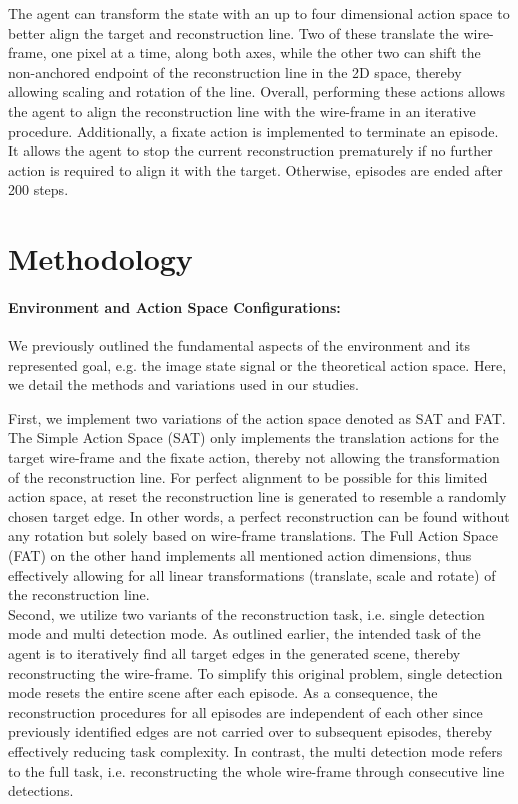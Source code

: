 \documentclass[11pt]{article} %
\begin{document}
The agent can transform the state with an up to four dimensional action space to better align the target and reconstruction line.
Two of these translate the wire-frame, one pixel at a time, along both axes, while the other two can shift the non-anchored endpoint of the reconstruction line in the 2D space, thereby allowing scaling and rotation of the line. Overall, performing these actions allows the agent to align the reconstruction line with the wire-frame in an iterative procedure. 
Additionally, a fixate action is implemented to terminate an episode. It allows the agent to stop the current reconstruction prematurely if no further action is required to align it with the target. Otherwise, episodes are ended after 200 steps.

\section{Methodology}
\paragraph{Environment and Action Space Configurations:}
We previously outlined the fundamental aspects of the environment and its represented goal, e.g. the image state signal or the theoretical action space. Here, we detail the methods and variations used in our studies.

First, we implement two variations of the action space denoted as SAT and FAT. 
The Simple Action Space (SAT) only implements the translation actions for the target wire-frame and the fixate action, thereby not allowing the transformation of the reconstruction line.
For perfect alignment to be possible for this limited action space, at reset the reconstruction line is generated to resemble a randomly chosen target edge. In other words, a perfect reconstruction can be found without any rotation but solely based on wire-frame translations.
The Full Action Space (FAT) on the other hand implements all mentioned action dimensions, thus effectively allowing for all linear transformations (translate, scale and rotate) of the reconstruction line.\\
Second, we utilize two variants of the reconstruction task, i.e. single detection mode and multi detection mode. As outlined earlier, the intended task of the agent is to iteratively find all target edges in the generated scene, thereby reconstructing the wire-frame. To simplify this original problem, single detection mode resets the entire scene after each episode. As a consequence, the reconstruction procedures for all episodes are independent of each other since previously identified edges are not carried over to subsequent episodes, thereby effectively reducing task complexity. In contrast, the multi detection mode refers to the full task, i.e. reconstructing the whole wire-frame through consecutive line detections.
\end{document}
